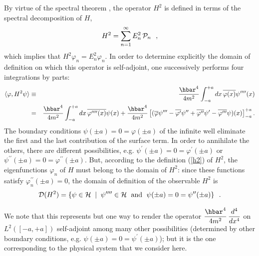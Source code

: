 \documentclass[12pt]{report}
\begin{document}
By virtue of the spectral theorem \cite{rs},
the operator $H^2$ is defined in terms of the spectral 
decomposition of  $H$,
\begin{equation}
\label{h2}
H^2 = \sum_{n=1}^{\infty} E_n^2 \, {\cal P}_n
\ \ ,
\end{equation}
which implies that 
$H^2 \varphi_n = E_n^2 \varphi_n$.
In order to determine explicitly the domain of definition on which this
operator 
is self-adjoint, one successively performs four integrations by parts: 
\begin{eqnarray*}
\langle \varphi , H^2 \psi \rangle & \equiv &
\ds{\hbar^4 \over 4m^2} \int_{-a}^{+a} dx \, \overline{\varphi(x)}
\psi^{\prime \prime \prime \prime}(x)
\\
&= &
\ds{\hbar^4 \over 4m^2} \int_{-a}^{+a} dx \, \overline{\varphi^{\prime
\prime \prime \prime}(x)}
\psi (x) +
\ds{\hbar^4 \over 4m^2} \left[
( \overline{\varphi} \psi^{\prime \prime \prime} - \overline{\varphi
^{\prime}} \psi^{\prime \prime} +
\overline{\varphi^{\prime \prime}} \psi^{\prime} -
\overline{\varphi^{\prime \prime\prime}} \psi )(x)
\right]_{-a}^{+a}
.
\end{eqnarray*}
The boundary conditions $\psi (\pm a) =0 = \varphi (\pm a)$
of the infinite well eliminate the first and the last contribution of the
surface term. In order to annihilate the others, there are 
different possibilities, e.g. 
$\psi^{\prime} (\pm a) =0 = \varphi^{\prime} (\pm a)$ or
$\psi^{\prime \prime} (\pm a) =0 = \varphi^{\prime \prime} (\pm a)$.
But, according to the definition (\ref{h2}) of $H^2$,
the eigenfunctions $\varphi_n$ of $H$ must belong to the domain 
of $H^2$: since these functions satisfy 
$\varphi_n ^{\prime \prime}
(\pm a)=0$, the  domain of definition of the observable $H^2$ is 
\begin{equation}
\label{dh2}
{\cal D} (H^2) = \{ \psi \in {\cal H} \; \mid \; \psi^{\prime \prime
\prime \prime}
\in {\cal H} \ \; {\rm and} \ \; \psi(\pm a) =0 = \psi^{\prime \prime}
(\pm a) \}
\ \ .
\end{equation}
 
 We note that this represents but one way to render the operator 
$\ds{\hbar^4 \over 4m^2} \, \ds{d^4 \over dx^4}$ 
on $L^2 ([-a,+a])$
self-adjoint among many other possibilities 
(determined by other boundary conditions,
e.g.  $\psi (\pm a ) = 0 = \psi^{\prime} (\pm a)$); 
but it is the one corresponding to the   
physical system that we consider here. 
\end{document}
